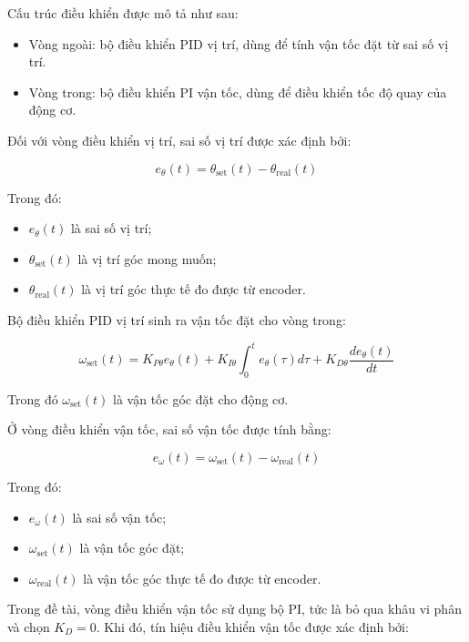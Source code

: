 Cấu trúc điều khiển được mô tả như sau:

\begin{itemize}
    \item Vòng ngoài: bộ điều khiển PID vị trí, dùng để tính vận tốc đặt từ sai số vị trí.
    \item Vòng trong: bộ điều khiển PI vận tốc, dùng để điều khiển tốc độ quay của động cơ.
\end{itemize}

Đối với vòng điều khiển vị trí, sai số vị trí được xác định bởi:

\begin{equation}
    e_{\theta}(t) = \theta_{\text{set}}(t) - \theta_{\text{real}}(t)
\end{equation}

Trong đó:
\begin{itemize}
    \item $e_{\theta}(t)$ là sai số vị trí;
    \item $\theta_{\text{set}}(t)$ là vị trí góc mong muốn;
    \item $\theta_{\text{real}}(t)$ là vị trí góc thực tế đo được từ encoder.
\end{itemize}

Bộ điều khiển PID vị trí sinh ra vận tốc đặt cho vòng trong:

\begin{equation}
    \omega_{\text{set}}(t)
    =
    K_{P\theta} e_{\theta}(t)
    +
    K_{I\theta} \int_{0}^{t} e_{\theta}(\tau)d\tau
    +
    K_{D\theta} \frac{d e_{\theta}(t)}{dt}
\end{equation}

Trong đó $\omega_{\text{set}}(t)$ là vận tốc góc đặt cho động cơ.

Ở vòng điều khiển vận tốc, sai số vận tốc được tính bằng:

\begin{equation}
    e_{\omega}(t) = \omega_{\text{set}}(t) - \omega_{\text{real}}(t)
\end{equation}

Trong đó:
\begin{itemize}
    \item $e_{\omega}(t)$ là sai số vận tốc;
    \item $\omega_{\text{set}}(t)$ là vận tốc góc đặt;
    \item $\omega_{\text{real}}(t)$ là vận tốc góc thực tế đo được từ encoder.
\end{itemize}

Trong đề tài, vòng điều khiển vận tốc sử dụng bộ PI, tức là bỏ qua khâu vi phân và chọn $K_D = 0$. Khi đó, tín hiệu điều khiển vận tốc được xác định bởi:

